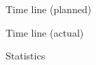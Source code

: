 \begin{myslide}{Time line (planned)}

\end{myslide}
\begin{myslide}{Time line  (actual)}
  
\end{myslide}

\begin{myslide}{Statistics}
  
\end{myslide}




